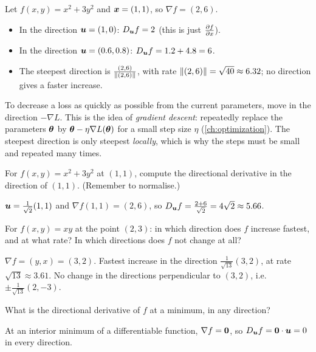 \begin{example}
Let $f(x, y) = x^2 + 3y^2$ and $\bm{x} = (1, 1)$, so $\nabla f = (2, 6)$.
\begin{itemize}
  \item In the direction $\bm{u} = (1, 0)$: $D_{\bm{u}}f = 2$ (this is just
    $\frac{\partial f}{\partial x}$).
  \item In the direction $\bm{u} = (0.6, 0.8)$: $D_{\bm{u}}f = 1.2 + 4.8 = 6$.
  \item The steepest direction is $\frac{(2, 6)}{\lVert(2,6)\rVert}$, with rate
    $\lVert(2, 6)\rVert = \sqrt{40} \approx 6.32$; no direction gives a faster
    increase.
\end{itemize}
\end{example}

\begin{mlnote}
To decrease a loss as quickly as possible from the current parameters, move in
the direction $-\nabla L$. This is the idea of \emph{gradient descent}:
repeatedly replace the parameters $\bm{\theta}$ by $\bm{\theta} - \eta\nabla L(\bm{\theta})$
for a small step size $\eta$ (\cref{ch:optimization}). The steepest direction
is only steepest \emph{locally}, which is why the steps must be small and
repeated many times.
\end{mlnote}

\sectionexercises

\begin{exercise}
For $f(x, y) = x^2 + 3y^2$ at $(1, 1)$, compute the directional derivative in
the direction of $(1, 1)$. (Remember to normalise.)
\end{exercise}
\begin{solution}
$\bm{u} = \tfrac{1}{\sqrt2}(1, 1)$ and $\nabla f(1,1) = (2, 6)$, so
$D_{\bm{u}}f = \tfrac{2 + 6}{\sqrt2} = 4\sqrt2 \approx 5.66$.
\end{solution}

\begin{exercise}
For $f(x, y) = xy$ at the point $(2, 3)$: in which direction does $f$ increase
fastest, and at what rate? In which directions does $f$ not change at all?
\end{exercise}
\begin{solution}
$\nabla f = (y, x) = (3, 2)$. Fastest increase in the direction
$\tfrac{1}{\sqrt{13}}(3, 2)$, at rate $\sqrt{13} \approx 3.61$. No change in the
directions perpendicular to $(3, 2)$, i.e.\ $\pm\tfrac{1}{\sqrt{13}}(2, -3)$.
\end{solution}

\begin{exercise}
What is the directional derivative of $f$ at a minimum, in any direction?
\end{exercise}
\begin{solution}
At an interior minimum of a differentiable function, $\nabla f = \bm{0}$, so
$D_{\bm{u}}f = \bm{0}\cdot\bm{u} = 0$ in every direction.
\end{solution}

